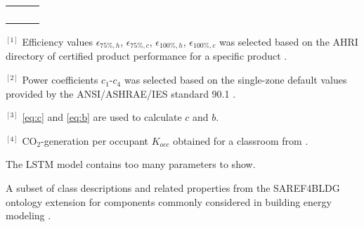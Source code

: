 \begin{table}[h!]
{\begin{tabular}{l|l|l}
                                          &                          &                    \\ 
                                          &                          &                    \\ 
                                          &                          &                    \\ 
                                          &                          &                    \\ 
\bottomrule
\end{tabular}
}
{\footnotesize \raggedright $^{[1]}$ Efficiency values $\epsilon_{75\%,h}$, $\epsilon_{75\%,c}$, $\epsilon_{100\%,h}$, $\epsilon_{100\%,c}$ was selected based on the AHRI directory of certified product performance for a specific product \cite{AHRI}. \par}
{\footnotesize \raggedright $^{[2]}$ Power coefficients $c_1$-$c_4$ was selected based on the single-zone default values provided by the ANSI/ASHRAE/IES standard 90.1 \cite{Goel2016ANSIASHRAEIESS9}. \par}
{\footnotesize \raggedright $^{[3]}$  \autoref{eq:c} and \autoref{eq:b} are used to calculate $c$ and $b$. \par}
{\footnotesize \raggedright $^{[4]}$ CO$_2$-generation per occupant $K_{occ}$ obtained for a classroom from \cite{Persily2017}. \par}
{\footnotesize \raggedright The LSTM model contains too many parameters to show. \par}
\end{table}


\begin{table*}[h!]
    \centering
    \caption{A subset of class descriptions and related properties from the SAREF4BLDG ontology extension for components commonly considered in building energy modeling \cite{saref4bldg}.}
    
    \label{tab:s4bldg_components}
\end{table*}



